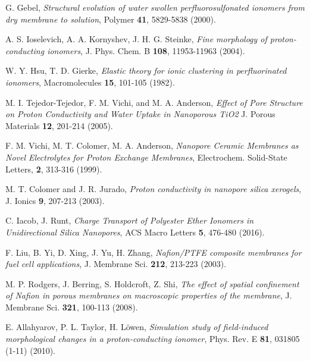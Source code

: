 \documentclass[3p,english,preprint]{elsarticle}
\begin{document}
\begin{thebibliography}{00}
G. Gebel, 
{\it Structural evolution of water swollen perfluorosulfonated ionomers
from dry membrane to solution},
 Polymer {\bf 41}, 5829-5838  (2000).

A. S. Ioselevich, A. A. Kornyshev,   J. H. G. Steinke, 
{\it Fine morphology of proton-conducting ionomers}, 
 J. Phys. Chem. B {\bf 108}, 11953-11963 (2004). 

W. Y. Hsu, T. D. Gierke,
{\it Elastic theory for ionic clustering in perfluorinated ionomers},
Macromolecules  {\bf 15}, 101-105 (1982).  


M. I. Tejedor-Tejedor,  F. M. Vichi, and M. A. Anderson, 
{\it Effect of Pore Structure on Proton Conductivity and Water Uptake 
in Nanoporous TiO2}
J. Porous Materials {\bf 12}, 201-214 (2005).


 F. M. Vichi, M. T. Colomer, M. A. Anderson, 
{\it Nanopore Ceramic Membranes as Novel Electrolytes for Proton Exchange Membranes},
Electrochem. Solid-State Letters, {\bf 2}, 313-316 (1999). 




M. T. Colomer and J. R. Jurado, 
{\it Proton conductivity in nanopore silica xerogels},
J. Ionics {\bf 9},  207-213 (2003).


C. Iacob, J. Runt, 
{\it Charge Transport of Polyester Ether Ionomers in Unidirectional 
Silica Nanopores}, 
ACS Macro Letters {\bf 5},  476-480 (2016). 


F. Liu, B. Yi, D. Xing, J. Yu, H. Zhang,   
{\it Nafion/PTFE composite membranes for fuel cell applications}, 
J. Membrane Sci. {\bf 212}, 213-223 (2003).



 M. P. Rodgers, J. Berring, S. Holdcroft, Z. Shi,
{\it The effect of spatial confinement of Nafion in porous membranes on
 macroscopic properties of the membrane}, 
 J. Membrane Sci.  {\bf 321}, 100-113 (2008).





E. Allahyarov, P.  L. Taylor, H. L{\"o}wen, 
{\it Simulation study of field-induced morphological changes 
in a proton-conducting ionomer},
Phys. Rev. E {\bf 81}, 031805 (1-11) (2010).



\end{thebibliography}
\end{document}
